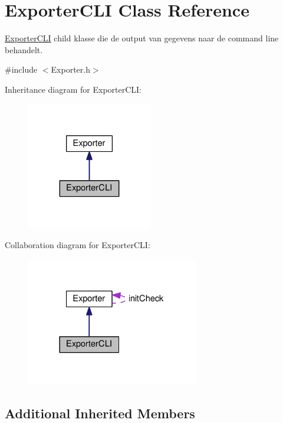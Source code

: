 \hypertarget{class_exporter_c_l_i}{}\section{Exporter\+C\+LI Class Reference}
\label{class_exporter_c_l_i}


\hyperlink{class_exporter_c_l_i}{Exporter\+C\+LI} child klasse die de output van gegevens naar de command line behandelt.  




{\ttfamily \#include $<$Exporter.\+h$>$}



Inheritance diagram for Exporter\+C\+LI\+:
\nopagebreak
\begin{figure}[H]
\begin{center}
\leavevmode
\includegraphics[width=155pt]{class_exporter_c_l_i__inherit__graph}
\end{center}
\end{figure}


Collaboration diagram for Exporter\+C\+LI\+:
\nopagebreak
\begin{figure}[H]
\begin{center}
\leavevmode
\includegraphics[width=213pt]{class_exporter_c_l_i__coll__graph}
\end{center}
\end{figure}
\subsection*{Additional Inherited Members}



